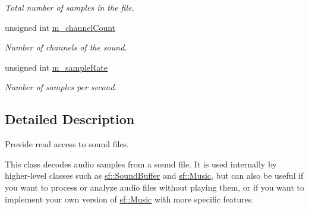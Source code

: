\begin{DoxyCompactItemize}
\begin{DoxyCompactList}\small\item\em Total number of samples in the file. \end{DoxyCompactList}\item 
\mbox{\label{classsf_1_1_input_sound_file_a8139ba49fe8f159bc338766d7c761f2d}} 
unsigned int \mbox{\hyperlink{classsf_1_1_input_sound_file_a8139ba49fe8f159bc338766d7c761f2d}{m\+\_\+channel\+Count}}
\begin{DoxyCompactList}\small\item\em Number of channels of the sound. \end{DoxyCompactList}\item 
\mbox{\label{classsf_1_1_input_sound_file_a7ce1620cc87d165b3ab9c4f623cad57d}} 
unsigned int \mbox{\hyperlink{classsf_1_1_input_sound_file_a7ce1620cc87d165b3ab9c4f623cad57d}{m\+\_\+sample\+Rate}}
\begin{DoxyCompactList}\small\item\em Number of samples per second. \end{DoxyCompactList}\end{DoxyCompactItemize}


\subsection{Detailed Description}
Provide read access to sound files. 

\begin{DoxyVerb}\end{DoxyVerb}


This class decodes audio samples from a sound file. It is used internally by higher-\/level classes such as \mbox{\hyperlink{classsf_1_1_sound_buffer}{sf\+::\+Sound\+Buffer}} and \mbox{\hyperlink{classsf_1_1_music}{sf\+::\+Music}}, but can also be useful if you want to process or analyze audio files without playing them, or if you want to implement your own version of \mbox{\hyperlink{classsf_1_1_music}{sf\+::\+Music}} with more specific features.

